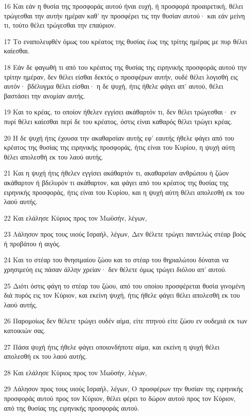 \par 16 Και εάν η θυσία της προσφοράς αυτού ήναι ευχή, ή προσφορά προαιρετική, θέλει τρώγεσθαι την αυτήν ημέραν καθ' ην προσφέρει τις την θυσίαν αυτού· και εάν μείνη τι, τούτο θέλει τρώγεσθαι την επαύριον.
\par 17 Το εναπολειφθέν όμως του κρέατος της θυσίας έως της τρίτης ημέρας με πυρ θέλει καίεσθαι.
\par 18 Εάν δε φαγωθή τι από του κρέατος της θυσίας της ειρηνικής προσφοράς αυτού την τρίτην ημέραν, δεν θέλει είσθαι δεκτός ο προσφέρων αυτήν, ουδέ θέλει λογισθή εις αυτόν· βδέλυγμα θέλει είσθαι· η δε ψυχή, ήτις ήθελε φάγει απ' αυτού, θέλει βαστάσει την ανομίαν αυτής.
\par 19 Και το κρέας, το οποίον ήθελεν εγγίσει ακάθαρτόν τι, δεν θέλει τρώγεσθαι· εν πυρί θέλει καίεσθαι περί δε του κρέατος, όστις είναι καθαρός θέλει τρώγει κρέας.
\par 20 Η δε ψυχή ήτις έχουσα την ακαθαρσίαν αυτής εφ' εαυτής ήθελε φάγει από του κρέατος της θυσίας της ειρηνικής προσφοράς, ήτις είναι του Κυρίου, η ψυχή αύτη θέλει απολεσθή εκ του λαού αυτής.
\par 21 Και η ψυχή ήτις ήθελεν εγγίσει ακάθαρτόν τι, ακαθαρσίαν ανθρώπου ή ζώον ακάθαρτον ή βδελυρόν τι ακάθαρτον, και φάγει από του κρέατος της θυσίας της ειρηνικής προσφοράς, ήτις είναι του Κυρίου, και η ψυχή αύτη θέλει απολεσθή εκ του λαού αυτής.
\par 22 Και ελάλησε Κύριος προς τον Μωϋσήν, λέγων,
\par 23 Λάλησον προς τους υιούς Ισραήλ, λέγων, Δεν θέλετε τρώγει παντελώς στέαρ βοός ή προβάτου ή αιγός.
\par 24 Και το στέαρ του θνησιμαίου ζώου και το στέαρ του θηριαλώτου δύναται να χρησιμεύη εις πάσαν άλλην χρείαν· δεν θέλετε όμως τρώγει διόλου απ' αυτού.
\par 25 Διότι όστις φάγη το στέαρ του ζώου, από του οποίου προσφέρεται θυσία γινομένη διά πυρός εις τον Κύριον, και εκείνη ψυχή, ήτις ήθελε φάγει θέλει απολεσθή εκ του λαού αυτής.
\par 26 Παρομοίως δεν θέλετε τρώγει ουδέν αίμα, είτε πτηνού είτε ζώου εν ουδεμιά εκ των κατοικιών σας.
\par 27 Πάσα ψυχή ήτις ήθελε φάγει οποιονδήποτε αίμα, και εκείνη η ψυχή θέλει απολεσθή εκ του λαού αυτής.
\par 28 Και ελάλησε Κύριος προς τον Μωϋσήν, λέγων,
\par 29 Λάλησον προς τους υιούς Ισραήλ, λέγων, Ο προσφέρων την θυσίαν της ειρηνικής προσφοράς αυτού προς τον Κύριον, θέλει φέρει το δώρον αυτού προς τον Κύριον, από της θυσίας της ειρηνικής προσφοράς αυτού.
